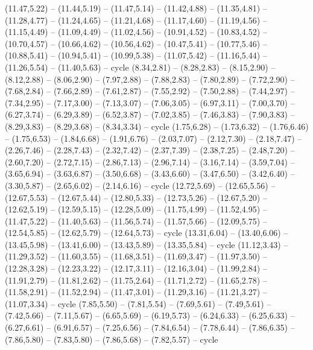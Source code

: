 \expandafter\def\csname geo:gebiet:OH\endcsname{
  (11.47,5.22) -- (11.44,5.19) -- (11.47,5.14) -- (11.42,4.88) -- (11.35,4.81) -- (11.28,4.77) -- (11.24,4.65) -- (11.21,4.68) -- (11.17,4.60) -- (11.19,4.56) -- (11.15,4.49) -- (11.09,4.49) -- (11.02,4.56) -- (10.91,4.52) -- (10.83,4.52) -- (10.70,4.57) -- (10.66,4.62) -- (10.56,4.62) -- (10.47,5.41) -- (10.77,5.46) -- (10.88,5.41) -- (10.94,5.41) -- (10.99,5.38) -- (11.07,5.42) -- (11.16,5.44) -- (11.26,5.54) -- (11.40,5.63) -- cycle}
\expandafter\def\csname geo:gebiet:OK\endcsname{
  (8.34,2.81) -- (8.28,2.83) -- (8.15,2.90) -- (8.12,2.88) -- (8.06,2.90) -- (7.97,2.88) -- (7.88,2.83) -- (7.80,2.89) -- (7.72,2.90) -- (7.68,2.84) -- (7.66,2.89) -- (7.61,2.87) -- (7.55,2.92) -- (7.50,2.88) -- (7.44,2.97) -- (7.34,2.95) -- (7.17,3.00) -- (7.13,3.07) -- (7.06,3.05) -- (6.97,3.11) -- (7.00,3.70) -- (6.27,3.74) -- (6.29,3.89) -- (6.52,3.87) -- (7.02,3.85) -- (7.46,3.83) -- (7.90,3.83) -- (8.29,3.83) -- (8.29,3.68) -- (8.34,3.34) -- cycle}
\expandafter\def\csname geo:gebiet:OR\endcsname{
  (1.75,6.28) -- (1.73,6.32) -- (1.76,6.46) -- (1.75,6.53) -- (1.84,6.68) -- (1.91,6.76) -- (2.03,7.07) -- (2.12,7.30) -- (2.18,7.47) -- (2.26,7.46) -- (2.28,7.43) -- (2.32,7.42) -- (2.37,7.39) -- (2.38,7.25) -- (2.48,7.20) -- (2.60,7.20) -- (2.72,7.15) -- (2.86,7.13) -- (2.96,7.14) -- (3.16,7.14) -- (3.59,7.04) -- (3.65,6.94) -- (3.63,6.87) -- (3.50,6.68) -- (3.43,6.60) -- (3.47,6.50) -- (3.42,6.40) -- (3.30,5.87) -- (2.65,6.02) -- (2.14,6.16) -- cycle}
\expandafter\def\csname geo:gebiet:PA\endcsname{
  (12.72,5.69) -- (12.65,5.56) -- (12.67,5.53) -- (12.67,5.44) -- (12.80,5.33) -- (12.73,5.26) -- (12.67,5.20) -- (12.62,5.19) -- (12.59,5.15) -- (12.28,5.09) -- (11.75,4.99) -- (11.52,4.95) -- (11.47,5.22) -- (11.40,5.63) -- (11.56,5.74) -- (11.57,5.66) -- (12.09,5.75) -- (12.54,5.85) -- (12.62,5.79) -- (12.64,5.73) -- cycle}
\expandafter\def\csname geo:gebiet:RI\endcsname{
  (13.31,6.04) -- (13.40,6.06) -- (13.45,5.98) -- (13.41,6.00) -- (13.43,5.89) -- (13.35,5.84) -- cycle}
\expandafter\def\csname geo:gebiet:SC\endcsname{
  (11.12,3.43) -- (11.29,3.52) -- (11.60,3.55) -- (11.68,3.51) -- (11.69,3.47) -- (11.97,3.50) -- (12.28,3.28) -- (12.23,3.22) -- (12.17,3.11) -- (12.16,3.04) -- (11.99,2.84) -- (11.91,2.79) -- (11.81,2.62) -- (11.75,2.64) -- (11.71,2.72) -- (11.65,2.78) -- (11.58,2.91) -- (11.52,2.94) -- (11.47,3.01) -- (11.29,3.16) -- (11.21,3.27) -- (11.07,3.34) -- cycle}
\expandafter\def\csname geo:gebiet:SD\endcsname{
  (7.85,5.50) -- (7.81,5.54) -- (7.69,5.61) -- (7.49,5.61) -- (7.42,5.66) -- (7.11,5.67) -- (6.65,5.69) -- (6.19,5.73) -- (6.24,6.33) -- (6.25,6.33) -- (6.27,6.61) -- (6.91,6.57) -- (7.25,6.56) -- (7.84,6.54) -- (7.78,6.44) -- (7.86,6.35) -- (7.86,5.80) -- (7.83,5.80) -- (7.86,5.68) -- (7.82,5.57) -- cycle}
